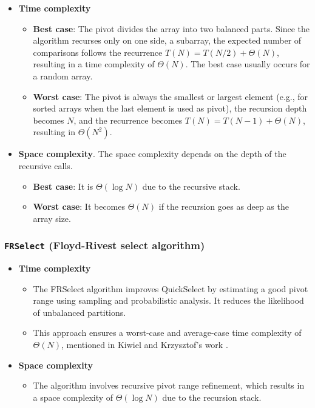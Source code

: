 \documentclass[acmconf,nonacm=true]{acmart}
\begin{document}
    \begin{itemize}
        \item \textbf{Time complexity}
        \begin{itemize}
            \item \textbf{Best case}: The pivot divides the array into two balanced parts. Since the algorithm recurses only on one side, a subarray, the expected number of comparisons follows the recurrence $T(N) = T(N/2) + \Theta(N)$, resulting in a time complexity of $\Theta(N)$. The best case usually occurs for a random array.
            \item \textbf{Worst case}: The pivot is always the smallest or largest element (e.g., for sorted arrays when the last element is used as pivot), the recursion depth becomes $N$, and the recurrence becomes $T(N) = T(N - 1) + \Theta(N)$, resulting in $\Theta(N^2)$. 
        \end{itemize}
    
        \item \textbf{Space complexity}. The space complexity depends on the depth of the recursive calls. 
        \begin{itemize}
            \item \textbf{Best case}: It is $\Theta(\log N)$ due to the recursive stack. 
            \item \textbf{Worst case}: It becomes $\Theta(N)$ if the recursion goes as deep as the array size.
        \end{itemize}
    \end{itemize}

\subsubsection{\texttt{FRSelect} (Floyd-Rivest select algorithm)}

    \begin{itemize}
        \item \textbf{Time complexity}
        \begin{itemize}
            \item The FRSelect algorithm improves QuickSelect by estimating a good pivot range using sampling and probabilistic analysis. It reduces the likelihood of unbalanced partitions. 
            \item This approach ensures a worst-case and average-case time complexity of $\Theta(N)$, mentioned in Kiwiel and Krzysztof's work \cite{kiwiel2005floyd}.
        \end{itemize}

        \item \textbf{Space complexity}
        \begin{itemize}
            \item The algorithm involves recursive pivot range refinement, which results in a space complexity of $\Theta(\log N)$ due to the recursion stack.
        \end{itemize}
    \end{itemize}
\end{document}
